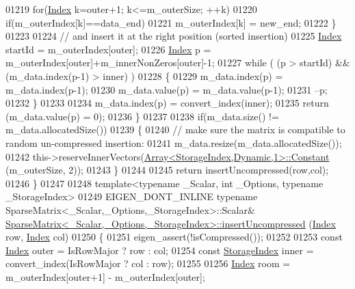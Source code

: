 \begin{DoxyCode}
01219       \textcolor{keywordflow}{for}(\hyperlink{group___core___module_a554f30542cc2316add4b1ea0a492ff02}{Index} k=outer+1; k<=m\_outerSize; ++k)
01220         \textcolor{keywordflow}{if}(m\_outerIndex[k]==data\_end)
01221           m\_outerIndex[k] = new\_end;
01222     \}
01223     
01224     \textcolor{comment}{// and insert it at the right position (sorted insertion)}
01225     \hyperlink{group___core___module_a554f30542cc2316add4b1ea0a492ff02}{Index} startId = m\_outerIndex[outer];
01226     \hyperlink{group___core___module_a554f30542cc2316add4b1ea0a492ff02}{Index} p = m\_outerIndex[outer]+m\_innerNonZeros[outer]-1;
01227     \textcolor{keywordflow}{while} ( (p > startId) && (m\_data.index(p-1) > inner) )
01228     \{
01229       m\_data.index(p) = m\_data.index(p-1);
01230       m\_data.value(p) = m\_data.value(p-1);
01231       --p;
01232     \}
01233     
01234     m\_data.index(p) = convert\_index(inner);
01235     \textcolor{keywordflow}{return} (m\_data.value(p) = 0);
01236   \}
01237   
01238   \textcolor{keywordflow}{if}(m\_data.size() != m\_data.allocatedSize())
01239   \{
01240     \textcolor{comment}{// make sure the matrix is compatible to random un-compressed insertion:}
01241     m\_data.resize(m\_data.allocatedSize());
01242     this->reserveInnerVectors(\hyperlink{group___core___module_class_eigen_1_1_array}{Array<StorageIndex,Dynamic,1>::Constant}
      (m\_outerSize, 2));
01243   \}
01244   
01245   \textcolor{keywordflow}{return} insertUncompressed(row,col);
01246 \}
01247     
01248 \textcolor{keyword}{template}<\textcolor{keyword}{typename} \_Scalar, \textcolor{keywordtype}{int} \_Options, \textcolor{keyword}{typename} \_StorageIndex>
01249 EIGEN\_DONT\_INLINE \textcolor{keyword}{typename} SparseMatrix<\_Scalar,\_Options,\_StorageIndex>::Scalar& 
      \hyperlink{group___sparse_core___module_class_eigen_1_1_sparse_matrix}{SparseMatrix<\_Scalar,\_Options,\_StorageIndex>::insertUncompressed}
      (\hyperlink{group___core___module_a554f30542cc2316add4b1ea0a492ff02}{Index} row, \hyperlink{group___core___module_a554f30542cc2316add4b1ea0a492ff02}{Index} col)
01250 \{
01251   eigen\_assert(!isCompressed());
01252 
01253   \textcolor{keyword}{const} \hyperlink{group___core___module_a554f30542cc2316add4b1ea0a492ff02}{Index} outer = IsRowMajor ? row : col;
01254   \textcolor{keyword}{const} \hyperlink{group___sparse_core___module_a0b540ba724726ebe953f8c0df06081ed}{StorageIndex} inner = convert\_index(IsRowMajor ? col : row);
01255 
01256   \hyperlink{group___core___module_a554f30542cc2316add4b1ea0a492ff02}{Index} room = m\_outerIndex[outer+1] - m\_outerIndex[outer];

\end{DoxyCode}
